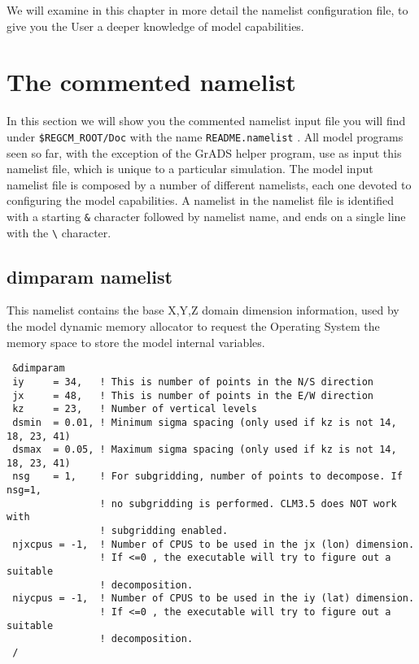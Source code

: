 %
%

We will examine in this chapter in more detail the namelist configuration file,
to give you the User a deeper knowledge of model capabilities.

\section{The commented namelist}

In this section we will show you the commented namelist input file you will
find under \verb=$REGCM_ROOT/Doc= with the name \verb=README.namelist= .
All model programs seen so far, with the exception of the GrADS helper program,
use as input this namelist file, which is unique to a particular simulation.
The model input namelist file is composed by a number of different namelists,
each one devoted to configuring the model capabilities.
A namelist in the namelist file is identified with a starting \verb=&= character
followed by namelist name, and ends on a single line with the \verb=\=
character.

\subsection{dimparam namelist}
\label{dimparam}

This namelist contains the base X,Y,Z domain dimension information, used
by the model dynamic memory allocator to request the Operating System the
memory space to store the model internal variables.

{\footnotesize
\begin{Verbatim}
 &dimparam
 iy     = 34,   ! This is number of points in the N/S direction
 jx     = 48,   ! This is number of points in the E/W direction
 kz     = 23,   ! Number of vertical levels
 dsmin  = 0.01, ! Minimum sigma spacing (only used if kz is not 14, 18, 23, 41)
 dsmax  = 0.05, ! Maximum sigma spacing (only used if kz is not 14, 18, 23, 41)
 nsg    = 1,    ! For subgridding, number of points to decompose. If nsg=1,
                ! no subgridding is performed. CLM3.5 does NOT work with
                ! subgridding enabled.
 njxcpus = -1,  ! Number of CPUS to be used in the jx (lon) dimension.
                ! If <=0 , the executable will try to figure out a suitable
                ! decomposition.
 niycpus = -1,  ! Number of CPUS to be used in the iy (lat) dimension.
                ! If <=0 , the executable will try to figure out a suitable
                ! decomposition.
 /
\end{Verbatim}
}

